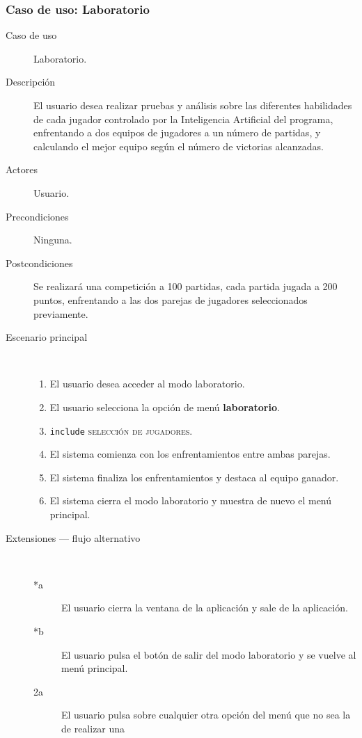 \subsubsection{Caso de uso: Laboratorio}

\begin{description}
    \item[Caso de uso] Laboratorio.
    \item[Descripción] El usuario desea realizar pruebas y análisis sobre las diferentes habilidades de cada jugador
            controlado por la Inteligencia Artificial del programa, enfrentando a dos equipos de jugadores a un 
            número de partidas, y calculando el mejor equipo según el número de victorias alcanzadas.
    \item[Actores] Usuario.
    \item[Precondiciones] Ninguna.
    \item[Postcondiciones] Se realizará una competición a 100 partidas, cada partida jugada a 200 puntos, enfrentando
            a las dos parejas de jugadores seleccionados previamente.
    \item[Escenario principal] $\quad$
        \begin{enumerate}
            \item El usuario desea acceder al modo laboratorio.
            \item El usuario selecciona la opción de menú \textbf{laboratorio}.
            \item \texttt{include} \textsc{selección de jugadores}.
            \item El sistema comienza con los enfrentamientos entre ambas parejas.
            \item El sistema finaliza los enfrentamientos y destaca al equipo ganador.
            \item El sistema cierra el modo laboratorio y muestra de nuevo el menú principal.
        \end{enumerate}
    \item[Extensiones --- flujo alternativo] $\quad$
        \begin{description}
            \item[*a ] El usuario cierra la ventana de la aplicación y sale de la aplicación.
            \item[*b ] El usuario pulsa el botón de salir del modo laboratorio y se vuelve al menú principal.
            \item[2a ] El usuario pulsa sobre cualquier otra opción del menú que no sea la de realizar una

\end{description}
\end{description}
